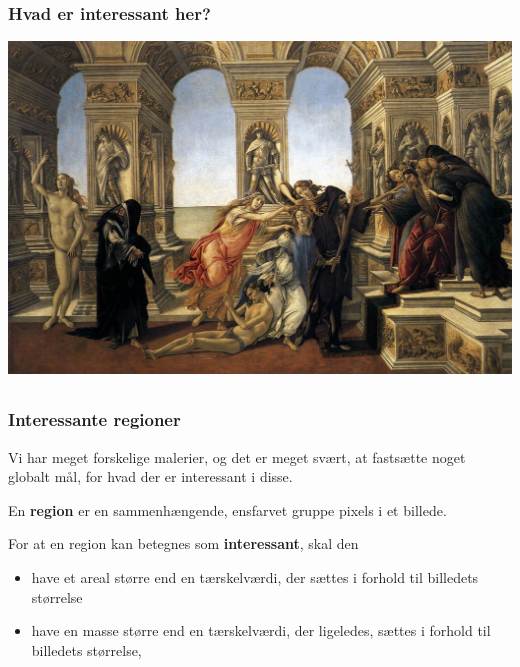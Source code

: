 \documentclass[xcolor=table]{beamer}
\begin{document}
\begin{frame}

    \frametitle{Hvad er interessant her?}

    \begin{center}
        \includegraphics[width=1.00\textwidth]{billeder/10calumn.jpg}
    \end{center}

\end{frame}

\subsection*{}
\begin{frame}

    \frametitle{Interessante regioner}

    Vi har meget forskelige malerier, og det er meget svært, at fastsætte noget globalt mål, for
    hvad der er interessant i disse.

    \begin{definition}
        En \textbf{region} er en sammenhængende, ensfarvet gruppe pixels i
        et billede.
    \end{definition}

    \begin{definition}
        For at en region kan betegnes som \textbf{interessant}, skal den
        \begin{itemize}
            \item have et areal større end en tærskelværdi, der sættes i
                forhold til billedets størrelse
            \item have en masse større end en tærskelværdi, der ligeledes,
                sættes i forhold til billedets størrelse,
        \end{itemize}
    \end{definition}

\end{frame}
\end{document}
